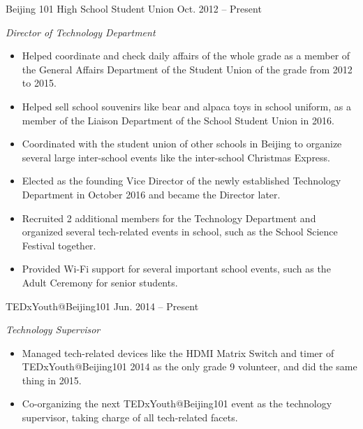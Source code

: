 \documentclass[hidelinks__VERSION__]{adamyi-cv} %
\begin{document}
\begin{entrylist}


\entry
{Beijing 101 High School Student Union}
{Oct. 2012 -- Present}
{\emph{Director of Technology Department}
\begin{itemize}
\item Helped coordinate and check daily affairs of the whole grade as a member of the General Affairs Department of the Student Union of the grade from 2012 to 2015.
\item Helped sell school souvenirs like bear and alpaca toys in school uniform, as a member of the Liaison Department of the School Student Union in 2016.
\item Coordinated with the student union of other schools in Beijing to organize several large inter-school events like the inter-school Christmas Express.
\item Elected as the founding Vice Director of the newly established Technology Department in October 2016 and became the Director later.
\item Recruited 2 additional members for the Technology Department and organized several tech-related events in school, such as the School Science Festival together.
\item Provided Wi-Fi support for several important school events, such as the Adult Ceremony for senior students.
\end{itemize}}


\entry
{TEDxYouth@Beijing101}
{Jun. 2014 -- Present}
{\emph{Technology Supervisor}
\begin{itemize}
\item Managed tech-related devices like the HDMI Matrix Switch and timer of TEDxYouth@Beijing101 2014 as the only grade 9 volunteer, and did the same thing in 2015.
\item Co-organizing the next TEDxYouth@Beijing101 event as the technology supervisor, taking charge of all tech-related facets.
\end{itemize}}


\end{entrylist}
\end{document}
